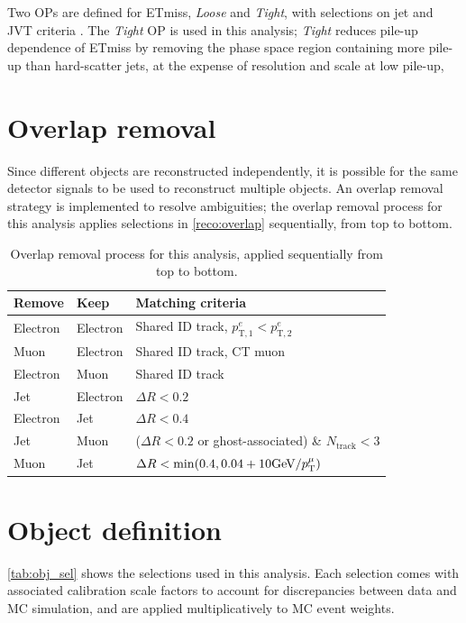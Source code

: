 \documentclass[../thesis.tex]{subfiles}
\begin{document}
Two \acs{OP}s are defined for \acs{ETmiss}, \textit{Loose} and \textit{Tight}, with selections on jet \pT and JVT criteria \citep{reco:met2}. The \textit{Tight} \acs{OP} is used in this analysis; \textit{Tight} reduces pile-up dependence of \acs{ETmiss} by removing the phase space region containing more pile-up than hard-scatter jets, at the expense of resolution and scale at low pile-up,

\section{Overlap removal}
Since different objects are reconstructed independently, it is possible for the same detector signals to be used to reconstruct multiple objects. An overlap removal strategy is implemented to resolve ambiguities; the overlap removal process for this analysis applies selections in \autoref{reco:overlap} sequentially, from top to bottom.

\begin{table}[!ht]
\centering
\caption{\label{reco:overlap}Overlap removal process for this analysis, applied sequentially from top to bottom.}%
\begin{tabular}{lll}
\toprule
Remove		& Keep		& Matching criteria \\
\midrule
Electron	& Electron 	& Shared ID track, $p^e_\mathrm{T,1}<p^e_\mathrm{T,2}$ \\
Muon		& Electron	& Shared ID track, CT muon \\
Electron	& Muon		& Shared ID track \\
Jet			& Electron	& $\Delta R <0.2$ \\
Electron	& Jet		& $\Delta R <0.4$ \\
Jet			& Muon		& ($\Delta R <0.2$ or ghost-associated) \& $N_\text{track}<3$ \\
Muon		& Jet		& $\Delta R < \min(0.4, 0.04+10 \text{GeV/\ensuremath{p_\mathrm{T}^\mu}})$ \\
\bottomrule
\end{tabular}
\end{table}

\section{Object definition}
\label{sec:objdef}
\autoref{tab:obj_sel} shows the selections used in this analysis. Each selection comes with associated calibration scale factors to account for discrepancies between data and \acs{MC} simulation, and are applied multiplicatively to \acs{MC} event weights.
\end{document}
